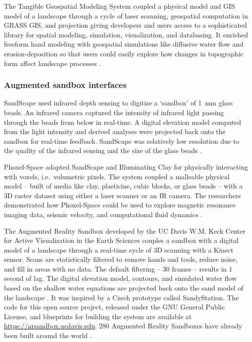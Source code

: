 \documentclass[prodmode,acmtochi]{acmsmall} %
\begin{document}
The Tangible Geospatial Modeling System
coupled a physical model and GIS model of a landscape 
through a cycle of laser scanning, 
geospatial computation in GRASS GIS, and projection
giving developers and users access to 
a sophisticated library for 
spatial modeling, simulation, visualization, and databasing.
It enriched freeform hand modeling with geospatial simulations 
like diffusive water flow and erosion-deposition 
so that users could easily explore how 
changes in topographic form affect landscape processes
\cite{Tateosian2010}.

\subsubsection{Augmented sandbox interfaces}
SandScape used infrared depth sensing
to digitize a `sandbox' of 1~mm glass beads. 
An infrared camera captured
the intensity of infrared light 
passing through the beads from below
in real-time. 
A digital elevation model  
computed from the light intensity 
and derived analyses 
were projected back onto the sandbox for real-time feedback.
SandScape was relatively low resolution due to
the quality of the infrared sensing and the size of the glass beads 
\cite{Ishii2004,Ratti2004}.  

Phoxel-Space adapted 
SandScape and Illuminating Clay
for physically interacting with voxels, 
i.e.~volumetric pixels. 
%
The system coupled a malleable physical model 
-- built of media like clay, plasticine, cubic blocks, or glass beads --
with a 3D raster dataset 
using either a laser scanner or an IR camera. 
%
The researchers demonstrated how Phoxel-Space
could be used to explore magnetic resonance imaging data,
seismic velocity, and computational fluid dynamics 
\cite{Ratti2004PhoxelSpace}.

The Augmented Reality Sandbox
developed by the 
UC Davis W.M. Keck Center for Active Visualization in the Earth Sciences 
couples a sandbox with a digital model of a landscape 
through a real-time cycle of 3D scanning with a Kinect sensor.
Scans are statistically filtered to remove hands and tools, 
reduce noise, and fill in areas with no data.
The default filtering -- 30 frames -- results in 1 second of lag.
The digital elevation model, contours, and simulated water flow
based on the shallow water equations
are projected back onto the sand model of the landscape
\cite{Kreylos2012}.
It was inspired by a Czech prototype called SandyStation.
The code for this open source project, released 
under the GNU General Public License,
and blueprints for building the system are 
available at \url{https://arsandbox.ucdavis.edu}.
280 Augmented Reality Sandboxes 
have already been built around the world
\cite{Kreylos2017}.
\end{document}
